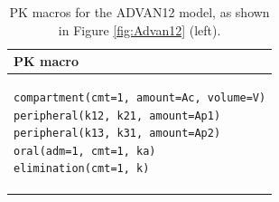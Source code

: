 \begin{table}[h!]
\setlength{\tabcolsep}{15pt}
\begin{center}
\begin{tabular}{l}
  \hline \hline
PK macro \\[-.25ex]
  \hline
\lstset{language=NONMEMdataSet}
\begin{lstlisting}
compartment(cmt=1, amount=Ac, volume=V)
peripheral(k12, k21, amount=Ap1)
peripheral(k13, k31, amount=Ap2)
oral(adm=1, cmt=1, ka)
elimination(cmt=1, k)
\end{lstlisting}
\\
  \hline
\end{tabular}
\caption{PK macros  for the ADVAN12 model, as shown in Figure \ref{fig:Advan12} (left).}
\label{tab:advan12Table}
\end{center}
\end{table}


